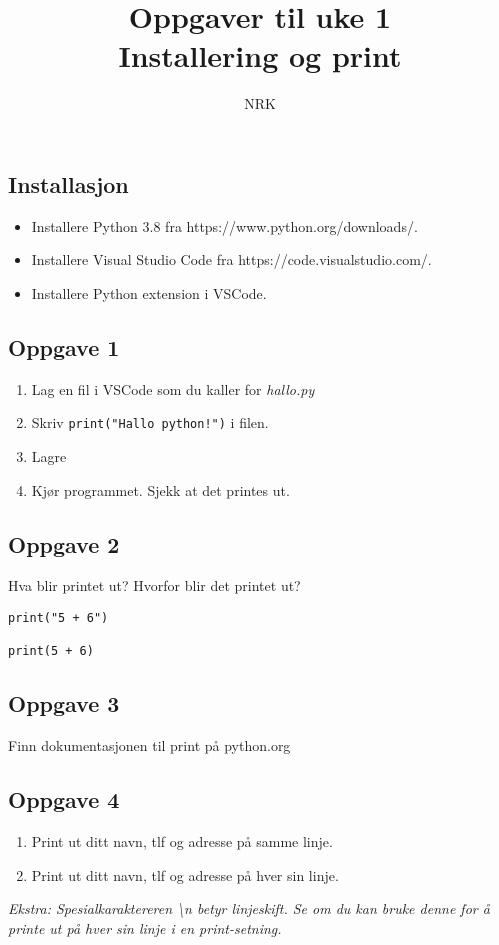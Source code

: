 \documentclass{article}
\title{Oppgaver til uke 1 \\ Installering og print}
\date{}
\author{NRK}
\begin{document}
\maketitle
\noindent

\subsection*{Installasjon}
\begin{itemize}
    \item Installere Python 3.8 fra https://www.python.org/downloads/.
    \item Installere Visual Studio Code fra https://code.visualstudio.com/.
    \item Installere Python extension i VSCode.
\end{itemize}


\subsection*{Oppgave 1}
\begin{enumerate}
    \item Lag en fil i VSCode som du kaller for \textit{hallo.py}
    \item Skriv \texttt{print("Hallo python!")} i filen.
    \item Lagre
    \item Kjør programmet. Sjekk at det printes ut.
\end{enumerate}


\subsection*{Oppgave 2}
Hva blir printet ut? Hvorfor blir det printet ut?

\begin{verbatim}
print("5 + 6")

print(5 + 6)
\end{verbatim}


\subsection*{Oppgave 3}
Finn dokumentasjonen til print på python.org 

\subsection*{Oppgave 4}
\begin{enumerate}
    \item Print ut ditt navn, tlf og adresse på samme linje.
    \item Print ut ditt navn, tlf og adresse på hver sin linje.
\end{enumerate}
 \noindent
\textit{Ekstra: Spesialkaraktereren \textbackslash n betyr linjeskift. Se om du kan bruke denne for å printe ut på hver sin linje i en print-setning.}
\end{document}
